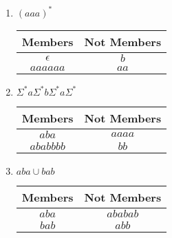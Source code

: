 \begin{enumerate}
\begin{enumerate}
\begin{table}[H]
\begin{tabular}{|c|c|}
                            \hline
                        \end{tabular}
                    \end{table}
              \item $(aaa)^\ast $
                    \begin{table}[H]
                        \centering
                        \begin{tabular}{|c|c|}
                            \hline
                            Members    & Not Members \\
                            \hline
                            $\epsilon$ & $b$         \\
                            $aaaaaa$   & $aa$        \\
                            \hline
                        \end{tabular}
                    \end{table}
              \item $\Sigma^\ast a\Sigma^\ast b\Sigma^\ast a\Sigma^\ast $
                    \begin{table}[H]
                        \centering
                        \begin{tabular}{|c|c|}
                            \hline
                            Members   & Not Members \\
                            \hline
                            $aba$     & $aaaa$      \\
                            $ababbbb$ & $bb$        \\
                            \hline
                        \end{tabular}
                    \end{table}
              \item $aba \cup bab $
                    \begin{table}[H]
                        \centering
                        \begin{tabular}{|c|c|}
                            \hline
                            Members & Not Members \\
                            \hline
                            $aba$   & $ababab$    \\
                            $bab$   & $abb$       \\
                            \hline
                        \end{tabular}
                    \end{table}

\end{enumerate}
\end{enumerate}
